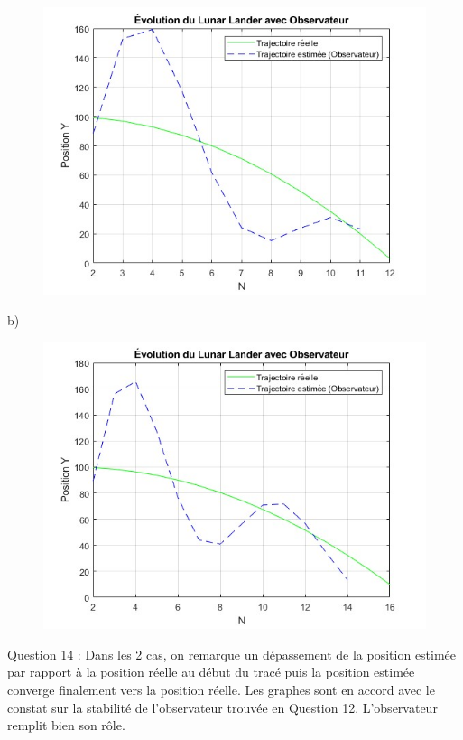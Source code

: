 \documentclass[14pt]{extarticle}
\begin{document}
\begin{figure} [tbh]
    \vspace{0.1cm}
        \centering
        \includegraphics[width=\columnwidth]{"images/q13_1.jpg"}
    
    \end{figure}

b) 
\begin{figure} [tbh]
    \vspace{0.1cm}
        \centering
        \includegraphics[width=\columnwidth]{"images/q13_2.jpg"}
    
    \end{figure}
Question 14 : 
    Dans les 2 cas, on remarque un dépassement de la position estimée par rapport à la position réelle au début du tracé puis la position estimée converge finalement vers la position réelle.
Les graphes sont en accord avec le constat sur la stabilité de l'observateur trouvée en Question 12. L'observateur remplit bien
son rôle.
\end{document}
